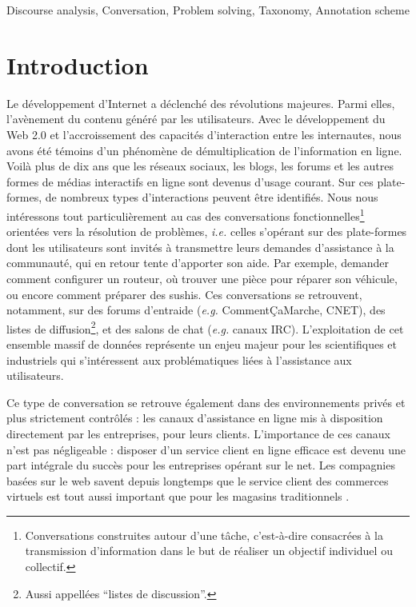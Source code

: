 \documentclass[10pt,a4paper,twoside]{article}
\newcommand{\quotes}[1]{``#1''}
\begin{document}
{Discourse analysis, Conversation, Problem solving, Taxonomy, Annotation scheme}


\section{Introduction}
\label{sec:introduction}

Le développement d'Internet a déclenché des révolutions majeures. Parmi elles, l'avènement du contenu généré par les utilisateurs. Avec le développement du Web 2.0 et l'accroissement des capacités d'interaction entre les internautes, nous avons été témoins d'un phénomène de démultiplication de l'information en ligne. Voilà plus de dix ans que les réseaux sociaux, les blogs, les forums et les autres formes de médias interactifs en ligne sont devenus d'usage courant. Sur ces plate-formes, de nombreux types d'interactions peuvent être identifiés. Nous nous intéressons tout particulièrement au cas des conversations fonctionnelles\footnote{Conversations construites autour d'une tâche, c'est-à-dire consacrées à la transmission d'information dans le but de réaliser un objectif individuel ou collectif.} orientées vers la résolution de problèmes, \textit{i.e.} celles s'opérant sur des plate-formes dont les utilisateurs sont invités à transmettre leurs demandes d'assistance à la communauté, qui en retour tente d'apporter son aide. Par exemple, demander comment configurer un routeur, où trouver une pièce pour réparer son véhicule, ou encore comment préparer des sushis. Ces conversations se retrouvent, notamment, sur des forums d'entraide (\textit{e.g.} CommentÇaMarche, CNET), des listes de diffusion\footnote{Aussi appellées \quotes{listes de discussion}.}, et des salons de chat (\textit{e.g.} canaux IRC). L'exploitation de cet ensemble massif de données représente un enjeu majeur pour les scientifiques et industriels qui s'intéressent aux problématiques liées à l'assistance aux utilisateurs.

Ce type de conversation se retrouve également dans des environnements privés et plus strictement contrôlés : les canaux d'assistance en ligne mis à disposition directement par les entreprises, pour leurs clients. L'importance de ces canaux n'est pas négligeable : disposer d'un service client en ligne efficace est devenu une part intégrale du succès pour les entreprises opérant sur le net. Les compagnies basées sur le web savent depuis longtemps que le service client des commerces virtuels est tout aussi important que pour les magasins traditionnels \cite{bernett2000e}.
\end{document}
